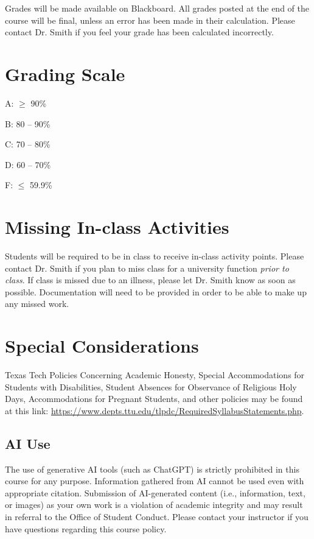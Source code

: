 \documentclass[12pt, notitlepage]{article}   	%
\begin{document}
{Grades will be made available on Blackboard. 
All grades posted at the end of the course will be final, 
unless an error has been made in their calculation.
Please contact Dr. Smith if you feel your grade has been calculated incorrectly.

\section{Grading Scale}
A: $\geq$ 90\% \par
B: 80 – 90\% \par
C: 70 – 80\% \par
D: 60 – 70\% \par
F: $\leq$ 59.9\% \par

\section{Missing In-class Activities}
Students will be required to be in class to receive in-class activity points. 
Please contact Dr. Smith if you plan to miss class for a university function 
\textit{prior to class}. If class is missed due to an illness, 
please let Dr. Smith know as soon as possible. Documentation will need to be provided
in order to be able to make up any missed work.

\section{Special Considerations}
Texas Tech Policies Concerning Academic Honesty, Special Accommodations for 
Students with Disabilities, Student Absences for Observance of Religious Holy Days, 
Accommodations for Pregnant Students, and other policies may be found at this link: 
\url{https://www.depts.ttu.edu/tlpdc/RequiredSyllabusStatements.php}.

\subsection{AI Use}
The use of generative AI tools (such as ChatGPT) is strictly prohibited in this course for any purpose.
Information gathered from AI cannot be used even with appropriate citation. Submission of AI-generated
content (i.e., information, text, or images) as your own work is a violation of academic integrity and may
result in referral to the Office of Student Conduct. Please contact your instructor if you have questions
regarding this course policy.

}
\end{document}
